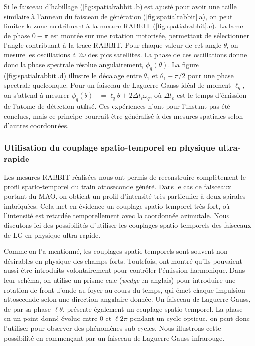 Si le faisceau d'habillage (\ref{fig:spatialrabbit}.b) est ajusté pour avoir une taille similaire à l'anneau du faisceau de génération (\ref{fig:spatialrabbit}.a), on peut limiter la zone contribuant à la mesure RABBIT (\ref{fig:spatialrabbit}.c). La lame de phase $0-\pi$ est montée sur une rotation motorisée, permettant de sélectionner l'angle contribuant à la trace RABBIT. Pour chaque valeur de cet angle $\theta$, on mesure les oscillations à 2$\omega$ des pics satellites. La phase de ces oscillations donne donc la phase spectrale résolue angulairement, $\phi_q(\theta)$. La figure (\ref{fig:spatialrabbit}.d) illustre le décalage entre $\theta_1$ et $\theta_1+\pi/2$ pour une phase spectrale quelconque. Pour un faisceau de Laguerre-Gauss idéal de moment $\ell_q$, on s'attend à mesurer $\phi_q(\theta)- = \ell_q\theta+2\Delta t_e\omega_q$, où $\Delta t_e$ est le temps d'émission de l'atome de détection utilisé. Ces expériences n'ont pour l'instant pas été conclues, mais ce principe pourrait être généralisé à des mesures spatiales selon d'autres coordonnées.

\subsubsection{Utilisation du couplage spatio-temporel en physique ultra-rapide}
Les mesures RABBIT réalisées nous ont permis de reconstruire complètement le profil spatio-temporel du train attoseconde généré. Dans le cas de faisceaux portant du MAO, on obtient un profil d'intensité très particulier à deux spirales imbriquées. Cela met en évidence un couplage spatio-temporel très fort, où l'intensité est retardée temporellement avec la coordonnée azimutale. Nous discutons ici des possibilités d'utiliser les couplages spatio-temporels des faisceaux de LG en physique ultra-rapide.

Comme on l'a mentionné, les couplages spatio-temporels sont souvent non désirables en physique des champs forts. Toutefois,  ont montré qu'ils pouvaient aussi être introduits volontairement pour contrôler l'émission harmonique. Dans leur schéma, on utilise un prisme cale (\textit{wedge} en anglais) pour introduire une rotation de front d'onde au foyer au cours du temps, qui émet chaque impulsion attoseconde selon une direction angulaire donnée. \linebreak
Un faisceau de Laguerre-Gauss, de par sa phase $\ell\theta$, présente également un couplage spatio-temporel. La phase en un point donné évolue entre 0 et $\ell 2\pi$ pendant un cycle optique, on peut donc l'utiliser pour observer des phénomènes sub-cycles. Nous illustrons cette possibilité en commençant par un faisceau de Laguerre-Gauss infrarouge.

